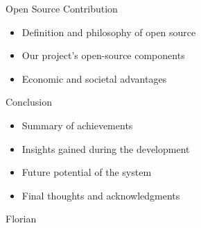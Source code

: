 \documentclass{beamer}
\begin{document}
\begin{frame}{Open Source Contribution}
  \begin{itemize}
    \item Definition and philosophy of open source
    \item Our project's open-source components
    \item Economic and societal advantages
  \end{itemize}
\end{frame}

\begin{frame}{Conclusion}
  \begin{itemize}
    \item Summary of achievements
    \item Insights gained during the development
    \item Future potential of the system
    \item Final thoughts and acknowledgments
  \end{itemize}
\end{frame}

\begin{frame}{Florian}
  
\end{frame}
\end{document}
